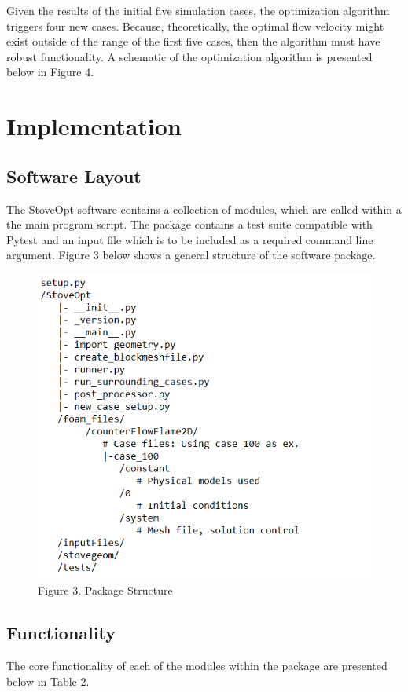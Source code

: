 \documentclass[3p,times,twocolumn]{elsarticle}
\begin{document}
Given the results of the initial five simulation cases, the optimization algorithm triggers four new cases. Because, theoretically, the optimal flow velocity might exist outside of the range of the first five cases, then the algorithm must have robust functionality. A schematic of the optimization algorithm is presented below in Figure 4.

\section{Implementation}

\subsection{Software Layout}
The StoveOpt software contains a collection of modules, which are called within a the main program script. The package contains a test suite compatible with Pytest and an input file which is to be included as a required command line argument. Figure 3 below shows a general structure of the software package.

\begin{figure}{\linewidth}
	\includegraphics[width=\linewidth]{skeleton.PNG}
	\caption{Figure 3. Package Structure}
\end{figure}

\subsection{Functionality}
The core functionality of each of the modules within the package are presented below in Table 2. 
\end{document}
